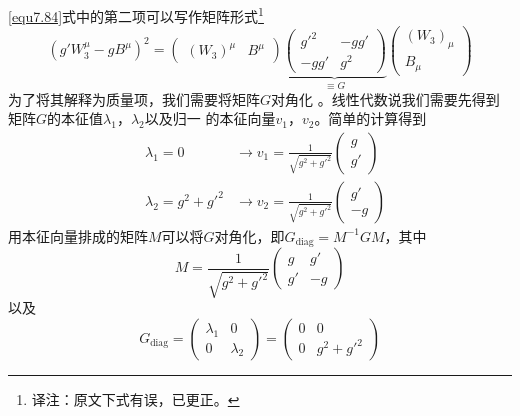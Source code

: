 \eqref{equ7.84}式中的第二项可以写作矩阵形式\footnote{译注：原文下式有误，已更正。}
\begin{equation}
(g'W_3^\mu-gB^\mu)^2 = \begin{pmatrix}
(W_3)^\mu & B^\mu
\end{pmatrix} \underbrace{\begin{pmatrix}
g'^2 & -gg' \\ -gg' & g^2
\end{pmatrix}}_{\equiv G} \begin{pmatrix}
(W_3)_\mu \\ B_\mu
\end{pmatrix}
\label{equ7.89}
\end{equation}
为了将其解释为质量项，我们需要将矩阵$G$对角化%
%
。线性代数说我们需要先得到矩阵$G$的本征值$\lambda_1$，$\lambda_2$以及归一%
%
的本征向量$v_1$，$v_2$。简单的计算得到
\[
\begin{aligned}
&\lambda_1 = 0 &\rightarrow v_1 = \frac{1}{\sqrt{g^2+g'^2}} \begin{pmatrix}
g\\ g'
\end{pmatrix} \\
&\lambda_2 = g^2+g'^2 &\rightarrow v_2 = \frac{1}{\sqrt{g^2+g'^2}} \begin{pmatrix}
g'\\ -g
\end{pmatrix}
\end{aligned}
\]
用本征向量排成的矩阵$M$可以将$G$对角化，即$G_\text{diag}=M^{-1}GM$，其中
\begin{equation}
\label{equ7.90}
M = \frac{1}{\sqrt{g^2+g'^2}} \begin{pmatrix}
g & g'\\ g'&-g
\end{pmatrix}
\end{equation}
以及
\begin{equation}
\label{equ7.91}
G_\text{diag} = \begin{pmatrix}
\lambda_1 & 0 \\ 0 & \lambda_2
\end{pmatrix} = \begin{pmatrix}
0 & 0 \\ 0 & g^2+g'^2
\end{pmatrix}
\end{equation}
